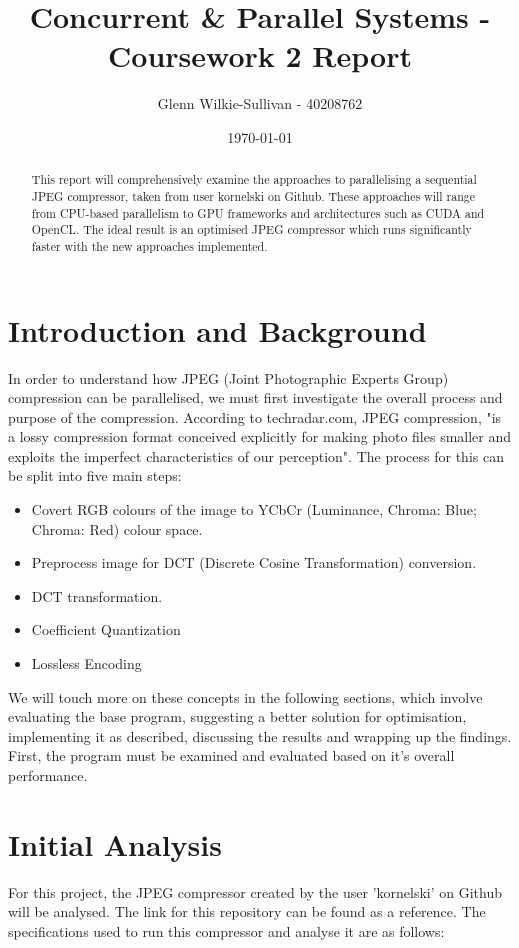 \documentclass[12pt, a4paper]{article}
\title{\vspace{-3cm}Concurrent \& Parallel Systems - Coursework 2 Report}
\author{Glenn Wilkie-Sullivan - 40208762}
\date{\today}
\begin{document}
\maketitle

\begin{abstract}
\noindent This report will comprehensively examine the approaches to parallelising a sequential JPEG compressor, taken from user kornelski on Github. These approaches will range from CPU-based parallelism to GPU frameworks and architectures such as CUDA and OpenCL. The ideal result is an optimised JPEG compressor which runs significantly faster with the new approaches implemented.
\end{abstract}

\section{Introduction and Background}
In order to understand how JPEG (Joint Photographic Experts Group) compression can be parallelised, we must first investigate the overall process and purpose of the compression. According to techradar.com,  JPEG compression, "is a lossy compression format conceived explicitly for making photo files smaller and exploits the imperfect characteristics of our perception". The process for this can be split into five main steps:

\begin{itemize}
\item Covert RGB colours of the image to YCbCr (Luminance, Chroma: Blue; Chroma: Red) colour space.
\item Preprocess image for DCT (Discrete Cosine Transformation) conversion.
\item DCT transformation.
\item Coefficient Quantization
\item Lossless Encoding
\end{itemize}

We will touch more on these concepts in the following sections, which involve evaluating the base program, suggesting a better solution for optimisation, implementing it as described, discussing the results and wrapping up the findings. First, the program must be examined and evaluated based on it's overall performance.

\section{Initial Analysis}
For this project, the JPEG compressor created by the user 'kornelski' on Github will be analysed. The link for this repository can be found as a reference. The specifications used to run this compressor and analyse it are as follows:
\end{document}
